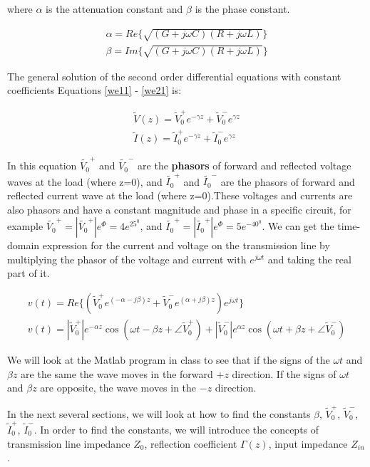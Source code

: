 \documentclass{ximera}
\begin{document}
where $\alpha$ is the attenuation constant and $\beta$ is the phase
constant.

\begin{eqnarray}
\alpha=Re\{ \sqrt{(G+j\omega C)  (R+j\omega L)  }  \} \nonumber \\ \nonumber
\beta = Im\{ \sqrt{(G+j\omega C)  (R+j\omega L)  }  \}
\end{eqnarray}

The general solution of the second order differential equations with constant coefficients
Equations \ref{we11} - \ref{we21}   is:

\begin{eqnarray}
\tilde{V}(z)=\tilde{V}_0^+ e^{-\gamma z} + \tilde{V}_0^- e^{\gamma z} \nonumber \\ \nonumber
\tilde{I}(z)=\tilde{I}_0^+ e^{-\gamma z} + \tilde{I}_0^- e^{\gamma z}
\end{eqnarray}

In this equation $\tilde{V_0}^+$ and $\tilde{V_0}^-$ are the {\bf
phasors} of forward and
reflected voltage waves at the load (where z=0), and $\tilde{I_0}^+$ and $\tilde{I_0}^-$ are the phasors of forward and
reflected current wave at the load (where z=0).These voltages and currents are also phasors and have a constant magnitude and phase in a specific circuit, for example $\tilde{V_0}^+=|\tilde{V_0}^+| e^\Phi=4e^{25^0}$, and $\tilde{I_0}^+=|\tilde{I_0}^+| e^\Phi=5e^{-40^0}$.
We can get the time-domain expression for the current and voltage on the
transmission line by multiplying the phasor of the voltage and current with $e^{j \omega t}$ and taking the real part of it.

\begin{eqnarray}
v(t)=Re\{ (\tilde{V}_0^+  e^{(-\alpha - j \beta) z} + \tilde{V}_0^- e^{(\alpha + j
 \beta) z})e^{j \omega t} \}  \nonumber \\ 
v(t)=|\tilde{V}_0^+| e^{ - \alpha z} \cos(\omega t - \beta z + \angle \tilde{V}_0^+)+
|\tilde{V}_0^-|e^{\alpha z} \cos(\omega t + \beta z + \angle \tilde{V}_0^-) \label{tdeq}
\end{eqnarray}

We will look at the Matlab program in class to see that if the signs of the $\omega t$ and
$\beta z$ are the same the wave moves in the forward $+z$
direction. If the signs of $\omega t$ and $\beta z$ are opposite, the
wave moves in the $-z$ direction.

In the next several sections, we will look at how to find the constants $\beta$, $\tilde{V}_0^+  $, $ \tilde{V}_0^-$, $\tilde{I}_0^+ $, $\tilde{I}_0^-$. In order to find the constants, we will introduce the concepts of transmission line impedance $Z_0$, reflection coefficient $\Gamma(z)$, input impedance $Z_{in}$. 
\end{document}
